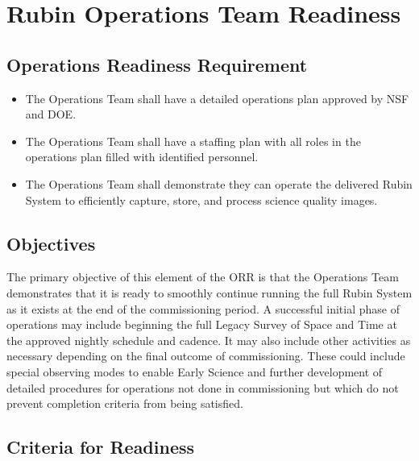 \section{Rubin Operations Team Readiness} \label{sec:ops}

\subsection{Operations Readiness Requirement}

\begin{itemize}

	\item The Operations Team shall have a detailed operations plan approved by NSF and DOE.
	\item The Operations Team shall have a staffing plan with all roles in the operations plan filled with identified personnel.
	\item The Operations Team shall demonstrate they can operate the delivered Rubin System
to efficiently capture, store, and process science quality images.

\end{itemize}

\subsection{Objectives}

The primary objective of this element of the ORR is that the Operations Team demonstrates that it
is ready to smoothly continue running the full Rubin System as it exists at the end of the
commissioning period. A successful initial phase of operations may include beginning the full
Legacy Survey of Space and Time at the approved nightly schedule and cadence.
It may also include other activities as necessary depending on the final outcome of commissioning.
These could include special observing modes to enable Early Science and further
development of detailed procedures for operations not done in commissioning but which
do not prevent completion criteria from being satisfied.

\subsection{Criteria for Readiness}

